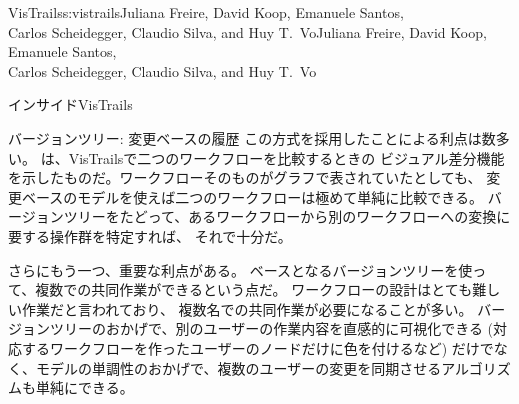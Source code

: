 \begin{aosachaptertoc}{VisTrails}{s:vistrails}{Juliana Freire, David Koop, Emanuele Santos, \\ Carlos Scheidegger, Claudio Silva, and Huy T.\ Vo}{Juliana Freire, David Koop, Emanuele Santos, \\ \hspace*{0.9cm} Carlos Scheidegger, Claudio Silva, and Huy T.\ Vo}
\begin{aosasect1}{インサイドVisTrails}
\begin{aosasect2}{バージョンツリー: 変更ベースの履歴}
この方式を採用したことによる利点は数多い。
は、VisTrailsで二つのワークフローを比較するときの
ビジュアル差分機能を示したものだ。ワークフローそのものがグラフで表されていたとしても、
変更ベースのモデルを使えば二つのワークフローは極めて単純に比較できる。
バージョンツリーをたどって、あるワークフローから別のワークフローへの変換に要する操作群を特定すれば、
それで十分だ。

さらにもう一つ、重要な利点がある。
ベースとなるバージョンツリーを使って、複数での共同作業ができるという点だ。
ワークフローの設計はとても難しい作業だと言われており、
複数名での共同作業が必要になることが多い。
バージョンツリーのおかげで、別のユーザーの作業内容を直感的に可視化できる
(対応するワークフローを作ったユーザーのノードだけに色を付けるなど)
だけでなく、モデルの単調性のおかげで、複数のユーザーの変更を同期させるアルゴリズムも単純にできる。


\end{aosasect2}
\end{aosasect1}
\end{aosachaptertoc}
